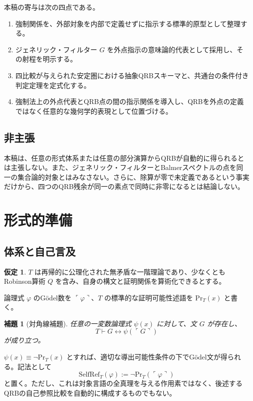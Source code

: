 \documentclass[a4paper,11pt]{ltjsarticle}
\theoremstyle{definition}
\newtheorem{assumption}[definition]{仮定}
\theoremstyle{plain}
\newtheorem{lemma}[definition]{補題}
\newcommand{\PrT}{\mathrm{Pr}_T}
\newcommand{\SelfRef}{\mathrm{SelfRef}}
\begin{document}
本稿の寄与は次の四点である。
\begin{enumerate}
 \item 強制関係を、外部対象を内部で定義せずに指示する標準的原型として整理する。
 \item ジェネリック・フィルター $G$ を外点指示の意味論的代表として採用し、その射程を明示する。
 \item 四比較が与えられた安定圏における抽象QRBスキーマと、共通台の条件付き判定定理を定式化する。
 \item 強制法上の外点代表とQRB点の間の指示関係を導入し、QRBを外点の定義ではなく任意的な幾何学的表現として位置づける。
\end{enumerate}

\subsection{非主張}

本稿は、任意の形式体系または任意の部分演算からQRBが自動的に得られるとは主張しない。また、ジェネリック・フィルターとBalmerスペクトルの点を同一の集合論的対象とはみなさない。さらに、除算が零で未定義であるという事実だけから、四つのQRB残余が同一の素点で同時に非零になるとは結論しない。

\section{形式的準備}

\subsection{体系と自己言及}

\begin{assumption}
$T$ は再帰的に公理化された無矛盾な一階理論であり、少なくともRobinson算術 $Q$ を含み、自身の構文と証明関係を算術化できるとする。
\end{assumption}

論理式 $\varphi$ のGödel数を $\ulcorner\varphi\urcorner$、$T$ の標準的な証明可能性述語を $\PrT(x)$ と書く。

\begin{lemma}[対角線補題]
任意の一変数論理式 $\psi(x)$ に対して、文 $G$ が存在し、
\begin{equation}
 T\vdash G\leftrightarrow\psi(\ulcorner G\urcorner)
\end{equation}
が成り立つ。
\end{lemma}

$\psi(x)\equiv\neg\PrT(x)$ とすれば、適切な導出可能性条件の下でGödel文が得られる\cite{kleene}。記法として
\begin{equation}
 \SelfRef_T(\varphi)
 :=\neg\PrT(\ulcorner\varphi\urcorner)
\end{equation}
と置く。ただし、これは対象言語の全真理を与える作用素ではなく、後述するQRBの自己参照比較を自動的に構成するものでもない。
\end{document}
